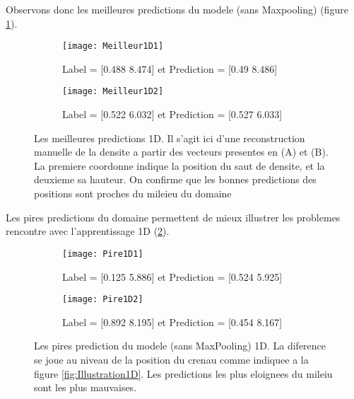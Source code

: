     Observons donc les meilleures predictions du modele (sans Maxpooling) (figure \ref{fig:Meilleur1D}).
    \begin{figure}[!h]
    \begin{subfigure}{.5\textwidth}
    \centering
    \texttt{[image: Meilleur1D1]}  
    \caption[Meilleur1D1]{Label = [0.488 8.474] et Prediction = [0.49  8.486]}
    \end{subfigure}
    \begin{subfigure}{.5\textwidth}
    \centering
    \texttt{[image: Meilleur1D2]}  
    \caption[Meilleur1D2]{Label = [0.522 6.032]  et Prediction = [0.527 6.033]}
    \end{subfigure}
    
     \centering
    \decoRule
    \caption[Meilleur 1D]{Les meilleures predictions 1D. Il s'agit ici d'une reconstruction manuelle de la densite a partir des vecteurs presentes en (A) et (B). La premiere coordonne indique la position du saut de densite, et la deuxieme sa hauteur. On confirme que les bonnes predictions des positions sont proches du mileieu du domaine}
    \label{fig:Meilleur1D}
    \end{figure}
    
    Les pires predictions du domaine permettent de mieux illustrer les problemes rencontre avec l'apprentissage 1D (\ref{fig:Pire1D}).
    
    \begin{figure}[H]
    \begin{subfigure}{.5\textwidth}
    \centering
    \texttt{[image: Pire1D1]}  
    \caption[Pire1D1]{Label = [0.125 5.886] et Prediction = [0.524 5.925]}
    \end{subfigure}
    \begin{subfigure}{.5\textwidth}
    \centering
    \texttt{[image: Pire1D2]}  
    \caption[Pire1D2]{Label = [0.892 8.195]  et Prediction = [0.454 8.167]}
    \end{subfigure}

     \centering
    \decoRule
    \caption[Pire1D]{Les pires prediction du modele (sans MaxPooling) 1D. La diference se joue au niveau de la position du crenau comme indiquee a la figure \ref{fig:Illustration1D}. Les predictions les plus eloignees du mileiu sont les plus mauvaises.}
    \label{fig:Pire1D}
    \end{figure}
    

